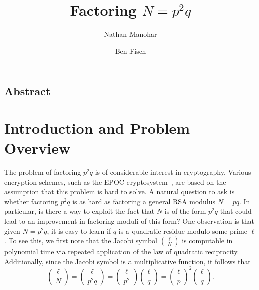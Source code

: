 \documentclass[letterpaper,twocolumn,10pt]{article}
\begin{document}
\date{}

\title{\Large \bf Factoring $N = p^2 q$}

\author{
{\rm Nathan Manohar}\\
\and
{\rm Ben Fisch}\\
} %

\maketitle

\thispagestyle{empty}


\subsection*{Abstract}

\section{Introduction and Problem Overview}

The problem of factoring $p^2 q$ is of considerable interest in cryptography. Various encryption schemes, such as the EPOC cryptosystem~\cite{Okamoto}, are based on the assumption that this problem is hard to solve. A natural question to ask is whether factoring $p^2q$ is as hard as factoring a general RSA modulus $N = pq$. In particular, is there a way to exploit the fact that $N$ is of the form $p^2q$ that could lead to an improvement in factoring moduli of this form? One observation is that given $N = p^2q$, it is easy to learn if $q$ is a quadratic residue modulo some prime $\ell$. To see this, we first note that the Jacobi symbol $\left(\frac{\ell}{N}\right)$ is computable in polynomial time via repeated application of the law of quadratic reciprocity. Additionally, since the Jacobi symbol is a multiplicative function, it follows that
\[
\left(\frac{\ell}{N}\right) = \left(\frac{\ell}{p^2q}\right) = \left(\frac{\ell}{p^2}\right) \left(\frac{\ell}{q}\right) = \left(\frac{\ell}{p}\right)^2 \left(\frac{\ell}{q}\right).
\]
\end{document}
